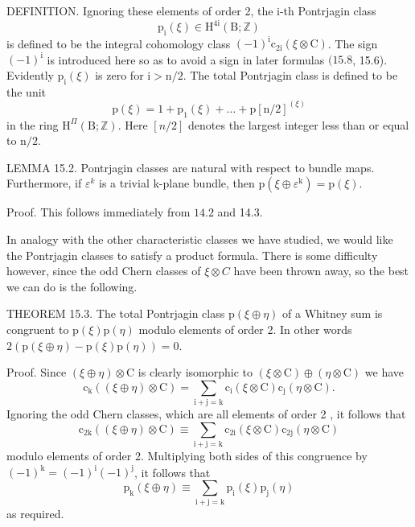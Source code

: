 \documentclass[10pt]{article}
\begin{document}
DEFINITION. Ignoring these elements of order 2, the i-th Pontrjagin class
$$
\mathrm{p}_{\mathrm{i}}(\xi) \in \mathrm{H}^{4 \mathrm{i}}(\mathrm{B} ; \mathbb{Z})
$$
is defined to be the integral cohomology class $(-1)^{\mathrm{i}} \mathrm{c}_{2 \mathrm{i}}(\xi \otimes \mathrm{C})$. The sign $(-1)^{\mathrm{i}}$ is introduced here so as to avoid a sign in later formulas $(15.8$, 15.6). Evidently $\mathrm{p}_{\mathrm{i}}(\xi)$ is zero for $\mathrm{i}>\mathrm{n} / 2$. The total Pontrjagin class is defined to be the unit
$$
\mathrm{p}(\xi)=1+\mathrm{p}_{1}(\xi)+\ldots+\mathrm{p}[\mathrm{n} / 2]^{(\xi)}
$$
in the ring $\mathrm{H}^{\Pi}(\mathrm{B} ; \mathbb{Z})$. Here $[n / 2]$ denotes the largest integer less than or equal to $\mathrm{n} / 2$.

LEMMA 15.2. Pontrjagin classes are natural with respect to bundle maps. Furthermore, if $\varepsilon^{k}$ is a trivial k-plane bundle, then $\mathrm{p}\left(\xi \oplus \varepsilon^{\mathrm{k}}\right)=\mathrm{p}(\xi)$.

Proof. This follows immediately from $14.2$ and 14.3.

In analogy with the other characteristic classes we have studied, we would like the Pontrjagin classes to satisfy a product formula. There is some difficulty however, since the odd Chern classes of $\xi \otimes C$ have been thrown away, so the best we can do is the following.

THEOREM 15.3. The total Pontrjagin class $\mathrm{p}(\xi \oplus \eta)$ of a Whitney sum is congruent to $\mathrm{p}(\xi) \mathrm{p}(\eta)$ modulo elements of order 2. In other words $2(\mathrm{p}(\xi \oplus \eta)-\mathrm{p}(\xi) \mathrm{p}(\eta))=0$.

Proof. Since $(\xi \oplus \eta) \otimes \mathrm{C}$ is clearly isomorphic to $(\xi \otimes \mathrm{C}) \oplus(\eta \otimes \mathrm{C})$ we have
$$
\mathrm{c}_{\mathrm{k}}((\xi \oplus \eta) \otimes \mathrm{C})=\sum_{\mathrm{i}+\mathrm{j}=\mathrm{k}} \mathrm{c}_{\mathrm{i}}(\xi \otimes \mathrm{C}) \mathrm{c}_{\mathrm{j}}(\eta \otimes \mathrm{C}) .
$$
Ignoring the odd Chern classes, which are all elements of order 2 , it follows that
$$
\mathrm{c}_{2 \mathrm{k}}((\xi \oplus \eta) \otimes \mathrm{C}) \equiv \sum_{\mathrm{i}+\mathrm{j}=\mathrm{k}} \mathrm{c}_{2 \mathrm{i}}(\xi \otimes \mathrm{C}) \mathrm{c}_{2 \mathrm{j}}(\eta \otimes \mathrm{C})
$$
modulo elements of order 2. Multiplying both sides of this congruence by $(-1)^{\mathrm{k}}=(-1)^{\mathrm{i}}(-1)^{\mathrm{j}}$, it follows that
$$
\mathrm{p}_{\mathrm{k}}(\xi \oplus \eta) \equiv \sum_{\mathrm{i}+\mathrm{j}=\mathrm{k}} \mathrm{p}_{\mathrm{i}}(\xi) \mathrm{p}_{\mathrm{j}}(\eta)
$$
as required.
\end{document}
